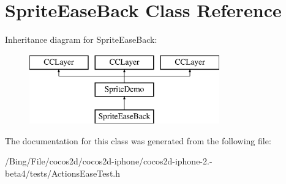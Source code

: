 \hypertarget{interface_sprite_ease_back}{\section{Sprite\-Ease\-Back Class Reference}
\label{interface_sprite_ease_back}
}
Inheritance diagram for Sprite\-Ease\-Back\-:\begin{figure}[H]
\begin{center}
\leavevmode
\includegraphics[height=3.000000cm]{interface_sprite_ease_back}
\end{center}
\end{figure}


The documentation for this class was generated from the following file\-:\begin{DoxyCompactItemize}
\item 
/\-Bing/\-File/cocos2d/cocos2d-\/iphone/cocos2d-\/iphone-\/2.-\/beta4/tests/Actions\-Ease\-Test.\-h\end{DoxyCompactItemize}
